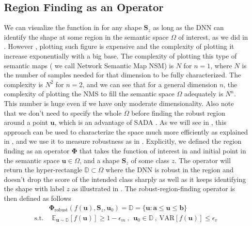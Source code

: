 \subsection{Region Finding as an Operator} \label{sec:operator}
We can visualize the function in \eqLabel{\ref{eq:f}} for any shape $\mathbf{S}_{z}$ as long as the DNN can identify the shape at some region in the semantic space $\Omega$ of interest, as we did in \figLabel{\ref{fig:intro_fig}}. However , plotting such figure is expensive and the complexity of plotting it increase exponentially with a big base. The complexity of plotting this type of semantic maps ( we call Network Semantic Map NSM) is $N$ for $n=1$, where $N$ is the number of samples needed for that dimension to be fully characterized. The complexity is $N^{2}$ for $n=2$, and we can see that for a general dimension $n$, the complexity of plotting the NMS to fill the semantic space $\Omega$ adequately is $N^{n}$. This number is huge even if we have only moderate dimensionality. Also note that we don't need to specify the whole $\Omega$ before finding the robust region around a point $\mathbf{u}$, which is an advantage of SADA \cite{sada}. As we will see in \secLabel{\ref{sec:application}}, this approach can be used to characterize the space much more efficiently as explained in \secLabel{\ref{sec:analysis}}, and we use it to measure robustness as in \secLabel{\ref{sec:application}}. Explicitly, we defined the region finding as an operator $\mathbf{\Phi}$ that takes the function of interest in \eqLabel{\ref{eq:f}} and initial point in the semantic space $\mathbf{u} \in \Omega $, and a shape $\mathbf{S}_{z}$ of some class $z$. The operator will return the hyper-rectangle $\mathbb{D} \subset \Omega $ where the DNN is robust in the region and doesn't drop the score of the intended class sharply as well as it keeps identifying the shape with label $z$ as illustrated in \figLabel{\ref{fig:NMS}}. The robust-region-finding operator is then defined as follows 
\begin{equation}
\begin{aligned} 
& \mathbf{\Phi}_{\text{robust}}(f(\mathbf{u}),\mathbf{S}_{z},\mathbf{u}_{0}) = \mathbb{D} = \{\mathbf{u}: \mathbf{a} \leq \mathbf{u} \leq \mathbf{b}\} \\
  \text{s.t.}&~~ \mathbb{E}_{\mathbf{u}\sim \mathbb{D}} [f(\mathbf{u})] \ge 1-\epsilon_{m}~, ~~ \mathbf{u}_{0} \in \mathbb{D} ~, ~ \text{VAR}[f(\mathbf{u})] \le \epsilon_{v}
\label{eq:phi-rob}
\end{aligned}
\end{equation}

